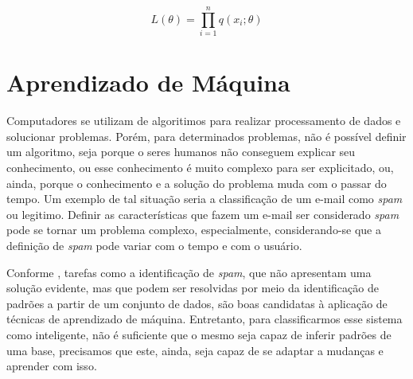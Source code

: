\documentclass[
    12pt,
    oneside,
    a4paper,
    english,
    brazil
]{abntex2}
\begin{document}
\begin{equation}\label{eq:likelihood}
    L(\theta) = \prod_{i=1}^{n}{q(x_i;\theta)}
\end{equation}


\section{Aprendizado de Máquina}

Computadores se utilizam de algoritimos  para realizar processamento de dados e
solucionar  problemas.  Porém,  para  determinados problemas,  não  é  possível
definir um  algoritmo, seja porque o  seres humanos não conseguem  explicar seu
conhecimento, ou esse conhecimento é  muito complexo para ser  explicitado, ou,
ainda, porque  o conhecimento  e a  solução do  problema muda  com o  passar do
tempo.  Um exemplo  de tal  situação seria  a classificação  de um  e-mail como
\textit{spam} ou legitimo.  Definir as características que fazem  um e-mail ser
considerado \textit{spam}  pode se  tornar um problema complexo, especialmente,
considerando-se que  a definição  de \textit{spam}  pode variar  com o  tempo e
com o usuário.

Conforme , tarefas como a identificação de \textit{spam}, que
não apresentam  uma solução  evidente, mas  que podem  ser resolvidas  por meio
da  identificação  de padrões  a  partir  de um  conjunto  de  dados, são  boas
candidatas à aplicação de técnicas de aprendizado de  máquina. Entretanto, para
classificarmos esse sistema como inteligente, não é suficiente que o mesmo seja
capaz de inferir padrões  de uma base, precisamos que este, ainda, seja capaz de
se adaptar a mudanças e aprender com isso.
\end{document}

